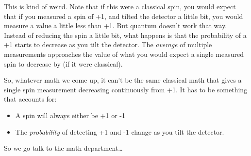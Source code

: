 \documentclass[
]{book}
\providecommand{\tightlist}{%
  \setlength{\itemsep}{0pt}\setlength{\parskip}{0pt}}
\begin{document}
This is kind of weird. Note that if this were a classical spin, you would expect that if you measured a spin of +1, and tilted the detector a little bit, you would measure a value a little less than +1. But quantum doesn't work that way. Instead of reducing the spin a little bit, what happens is that the probability of a +1 starts to decrease as you tilt the detector. The \emph{average} of multiple measurements approaches the value of what you would expect a single measured spin to decrease by (if it were classical).

So, whatever math we come up, it can't be the same classical math that gives a single spin measurement decreasing continuously from +1. It has to be something that accounts for:

\begin{itemize}
\tightlist
\item
  A spin will always either be +1 or -1
\item
  The \emph{probability} of detecting +1 and -1 change as you tilt the detector.
\end{itemize}

So we go talk to the math department\ldots{}

  
\end{document}
